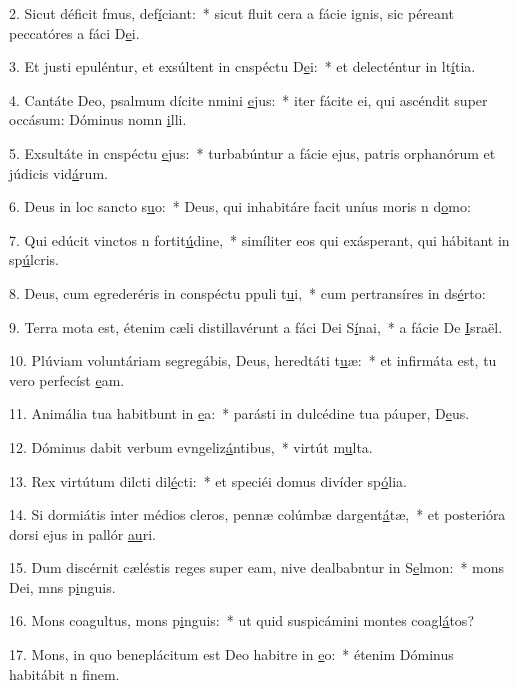2. Sicut déficit fmus, def\uline{í}ciant:~* sicut fluit cera a fácie ignis, sic péreant peccatóres a fáci D\uline{e}i.\par 
3. Et justi epuléntur, et exsúltent in cnspéctu D\uline{e}i:~* et delecténtur in lt\uline{í}tia.\par 
4. Cantáte Deo, psalmum dícite nmini \uline{e}jus:~* iter fácite ei, qui ascéndit super occásum: Dóminus nomn \uline{i}lli.\par 
5. Exsultáte in cnspéctu \uline{e}jus:~* turbabúntur a fácie ejus, patris orphanórum et júdicis vid\uline{á}rum.\par 
6. Deus in loc sancto s\uline{u}o:~* Deus, qui inhabitáre facit uníus moris n d\uline{o}mo:\par 
7. Qui edúcit vinctos n fortit\uline{ú}dine,~* simíliter eos qui exásperant, qui hábitant in sp\uline{ú}lcris.\par 
8. Deus, cum egrederéris in conspéctu ppuli t\uline{u}i,~* cum pertransíres in ds\uline{é}rto:\par 
9. Terra mota est, étenim cæli distillavérunt a fáci Dei S\uline{í}nai,~* a fácie De \uline{I}sraël.\par 
10. Plúviam voluntáriam segregábis, Deus, heredtáti t\uline{u}æ:~* et infirmáta est, tu vero perfecíst \uline{e}am.\par 
11. Animália tua habitbunt in \uline{e}a:~* parásti in dulcédine tua páuper, D\uline{e}us.\par 
12. Dóminus dabit verbum evngeliz\uline{á}ntibus,~* virtút m\uline{u}lta.\par 
13. Rex virtútum dilcti dil\uline{é}cti:~* et speciéi domus divíder sp\uline{ó}lia.\par 
14. Si dormiátis inter médios cleros, pennæ colúmbæ dargent\uline{á}tæ,~* et posterióra dorsi ejus in pallór \uline{au}ri.\par 
15. Dum discérnit cæléstis reges super eam, nive dealbabntur in S\uline{e}lmon:~* mons Dei, mns p\uline{i}nguis.\par 
16. Mons coagultus, mons p\uline{i}nguis:~* ut quid suspicámini montes coagl\uline{á}tos?\par 
17. Mons, in quo beneplácitum est Deo habitre in \uline{e}o:~* étenim Dóminus habitábit n f\uline{i}nem.\par 
